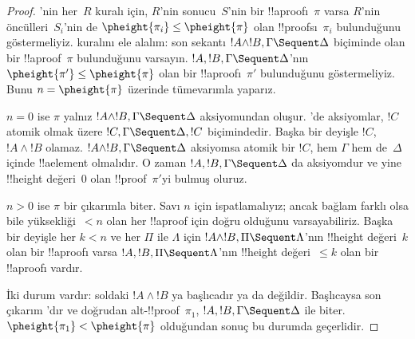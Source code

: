 \documentclass[../../../include/open-logic-section]{subfiles}
\begin{document}
\begin{proof}
'nin her~$R$ kuralı için, $R$'nin sonucu~$S$'nin bir
!!a{proof}{}ı~$\pi$ varsa $R$'nin öncülleri~$S_i$'nin de
$\pheight{\pi_i} \le \pheight{\pi}$ olan !!{proof}s{}ı~$\pi_i$ bulunduğunu
göstermeliyiz. \LeftR{\land} kuralını ele alalım: son sekantı $!A \land
!B, \Gamma \Sequent \Delta$ biçiminde olan bir !!a{proof}~$\pi$
bulunduğunu varsayın. $!A, !B, \Gamma \Sequent \Delta$'nın
$\pheight{\pi'} \le \pheight{\pi}$ olan bir !!a{proof}{}ı~$\pi'$ bulunduğunu
göstermeliyiz. Bunu $n = \pheight{\pi}$ üzerinde tümevarımla yaparız.

$n = 0$ ise $\pi$ yalnız $!A \land !B, \Gamma \Sequent \Delta$
aksiyomundan oluşur. 'de aksiyomlar, $!C$ atomik olmak üzere
$!C, \Gamma \Sequent \Delta, !C$ biçimindedir. Başka bir deyişle $!C$,
$!A \land !B$ olamaz. $!A \land !B, \Gamma \Sequent \Delta$ aksiyomsa
atomik bir $!C$, hem $\Gamma$ hem de~$\Delta$ içinde !!a{element} olmalıdır.
O zaman $!A, !B, \Gamma \Sequent \Delta$ da aksiyomdur ve yine
!!{height} değeri~$0$ olan !!{proof}~$\pi'$yi bulmuş oluruz.

$n>0$ ise $\pi$ bir çıkarımla biter. Savı $n$ için ispatlamalıyız; ancak
bağlam farklı olsa bile yüksekliği~$<n$ olan her !!a{proof} için doğru
olduğunu varsayabiliriz. Başka bir deyişle her $k<n$ ve her $\Pi$ ile
$\Lambda$ için $!A \land !B, \Pi \Sequent \Lambda$'nın !!{height} değeri~$k$
olan bir !!a{proof}{}ı varsa $!A, !B, \Pi \Sequent \Lambda$'nın
!!{height} değeri~$\le k$ olan bir !!a{proof}{}ı vardır.

İki durum vardır: soldaki $!A \land !B$ ya başlıcadır ya da değildir.
Başlıcaysa son çıkarım \LeftR{\land}'dır ve doğrudan
alt-!!{proof}~$\pi_1$, $!A, !B, \Gamma \Sequent \Delta$ ile biter.
$\pheight{\pi_1} < \pheight{\pi}$ olduğundan sonuç bu durumda geçerlidir.


\end{proof}
\end{document}
